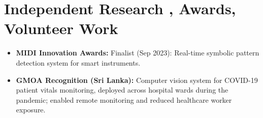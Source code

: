 \documentclass[11pt]{article}
\begin{document}
\section*{Independent Research , Awards, Volunteer Work}
\begin{itemize}[leftmargin=1.2em, itemsep=-0.25em]
    \item \textbf{MIDI Innovation Awards:} Finalist (Sep 2023): Real-time symbolic pattern detection system for smart instruments.
    \item \textbf{GMOA Recognition (Sri Lanka):} Computer vision system for COVID-19 patient vitals monitoring, deployed across hospital wards during the pandemic; enabled remote monitoring and reduced healthcare worker exposure.
\end{itemize}
\end{document}
